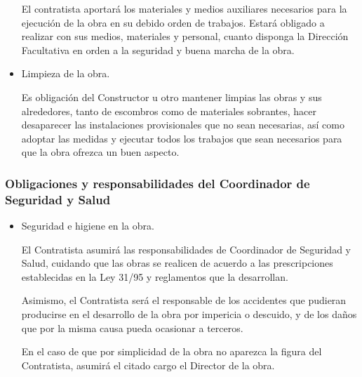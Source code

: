 \documentclass[../main.tex]{subfiles}
\begin{document}
\begin{itemize}
    \vspace{0.5 cm}
    El contratista aportará los materiales y medios auxiliares necesarios para la ejecución de la obra en su debido orden de trabajos. Estará obligado a realizar con sus medios, materiales y personal, cuanto disponga la Dirección Facultativa en orden a la seguridad y buena marcha de la obra.
    \item Limpieza de la obra. \par
    \vspace{0.5 cm}
    Es obligación del Constructor u otro mantener limpias las obras y sus alrededores, tanto de escombros como de materiales sobrantes, hacer desaparecer las instalaciones provisionales que no sean necesarias, así como adoptar las medidas y ejecutar todos los trabajos que sean necesarios para que la obra ofrezca un buen aspecto.
\end{itemize}

\subsubsection{Obligaciones y responsabilidades del Coordinador de Seguridad y Salud}
\begin{itemize}
    \item Seguridad e higiene en la obra. \par
    \vspace{0.5 cm}
    El Contratista asumirá las responsabilidades de Coordinador de Seguridad y Salud, cuidando que las obras se realicen de acuerdo a las prescripciones establecidas en la Ley 31/95 y reglamentos que la desarrollan. \par
    \vspace{0.5 cm}
    Asimismo, el Contratista será el responsable de los accidentes que pudieran producirse en el desarrollo de la obra por impericia o descuido, y de los daños que por la misma causa pueda ocasionar a terceros. \par
    \vspace{0.5 cm}
    En el caso de que por simplicidad de la obra no aparezca la figura del Contratista, asumirá el citado cargo el Director de la obra.
\end{itemize}
\end{document}
